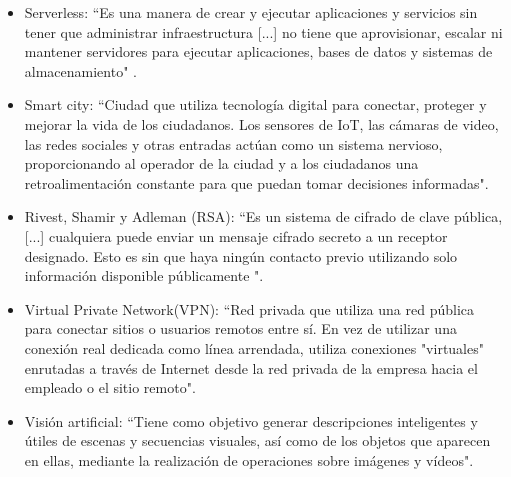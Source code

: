 \begin{itemize}
    \item Serverless: ``Es una manera de crear y ejecutar aplicaciones y servicios sin tener que administrar infraestructura [...] no tiene que aprovisionar, escalar ni mantener servidores para ejecutar aplicaciones, bases de datos y sistemas de almacenamiento" \cite{aWsSl}.
    \item Smart city: ``Ciudad que utiliza tecnología digital para conectar, proteger y mejorar la vida de los ciudadanos. Los sensores de IoT, las cámaras de video, las redes sociales y otras entradas actúan como un sistema nervioso, proporcionando al operador de la ciudad y a los ciudadanos una retroalimentación constante para que puedan tomar decisiones informadas"\cite{ciscoSC}.
    
    \item Rivest, Shamir y Adleman (RSA): ``Es un sistema de cifrado de clave pública, [...] cualquiera puede enviar un mensaje cifrado secreto a un receptor designado. Esto es sin que haya ningún contacto previo utilizando solo información disponible públicamente "\cite{mitRSA}.
    
    \item Virtual Private Network(VPN): ``Red privada que utiliza una red pública para conectar sitios o usuarios remotos entre sí. En vez de utilizar una conexión real dedicada como línea arrendada, utiliza conexiones "virtuales" enrutadas a través de Internet desde la red privada de la empresa hacia el empleado o el sitio remoto"\cite{ciscoVPN}.
    \item Visión artificial: ``Tiene como objetivo generar descripciones inteligentes y útiles de escenas y secuencias visuales, así como de los objetos que aparecen en ellas, mediante la realización de operaciones sobre imágenes y vídeos"\cite{mathworksVA}.


    
\end{itemize}